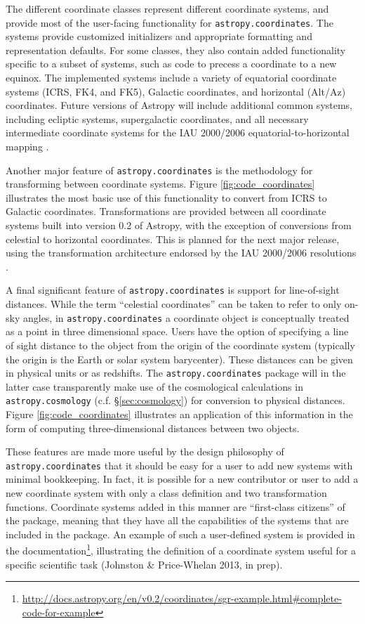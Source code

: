 \documentclass[traditabstract]{aa}
\begin{document}
The different coordinate classes represent different coordinate 
systems, and provide most of the user-facing
functionality for \texttt{astropy.coordinates}. The systems provide
customized initializers and appropriate formatting and representation
defaults. For some classes, they also contain added functionality specific to
a subset of systems, such as code to precess a coordinate to a new equinox.
The implemented systems include a variety of equatorial coordinate systems
(ICRS, FK4, and FK5), Galactic coordinates, and horizontal (Alt/Az)
coordinates. Future versions of Astropy will include additional common
systems, including ecliptic systems, supergalactic coordinates, and all
necessary intermediate coordinate systems for the IAU 2000/2006
equatorial-to-horizontal mapping \citep[e.g.,][]{soffel03, usnocircular179}.


Another major feature of \texttt{astropy.coordinates} is the methodology
for transforming between coordinate systems. Figure \ref{fig:code_coordinates} 
illustrates the most basic use of this functionality to convert from ICRS to 
Galactic coordinates.
Transformations are provided between all coordinate systems built into 
version 0.2 of Astropy, with the exception of conversions from
celestial to horizontal coordinates. This is planned for the next major
release, using  the transformation architecture endorsed by the IAU 
2000/2006 resolutions \citep[see e.g.,][]{soffel03, usnocircular179}. 

A final significant feature of \texttt{astropy.coordinates} is support for
line-of-sight distances. While the term ``celestial coordinates'' can be taken
to refer to only on-sky angles, in \texttt{astropy.coordinates} a coordinate
object is conceptually treated as a point in three dimensional space. Users
have the option of specifying a line of sight distance to the object from the
origin of the coordinate system (typically the origin is the Earth or solar
system barycenter). These distances can be given in physical units or as
redshifts. The \texttt{astropy.coordinates} package will in the latter case
transparently make use of the cosmological calculations in
\texttt{astropy.cosmology} (c.f. \S\ref{sec:cosmology}) for conversion to 
physical distances.  Figure \ref{fig:code_coordinates}  illustrates an
application of this information in the form of computing three-dimensional
distances between two objects.


These features are made more useful by the design philosophy of 
\texttt{astropy.coordinates} that it should be easy for a user to add 
new systems with minimal bookkeeping. In fact, it is possible
for a new contributor or user to add a new coordinate system with only a class
definition and two transformation functions. Coordinate systems added in this
manner are ``first-class citizens'' of the package, meaning that they have all
the capabilities of the systems that are included in the package. An 
example of such a user-defined system is provided in the 
documentation\footnote{\url{http://docs.astropy.org/en/v0.2/coordinates/sgr-example.html#complete-code-for-example}},
illustrating the definition of a coordinate system useful for a specific
scientific task (Johnston \& Price-Whelan 2013, in prep).
\end{document}
